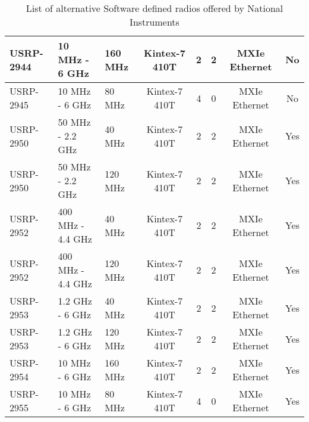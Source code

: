 \begin{landscape}
\begin{table}[htb]
\begin{center}
\begin{tabular}{|l|l|l|c|c|c|c|c|}
                USRP-2944      & 10 MHz - 6 GHz              & 160 MHz                               & Kintex-7 410T & 2               & 2                & MXIe Ethernet          & No                     \\ \hline
                USRP-2945      & 10 MHz - 6 GHz              & 80 MHz                                & Kintex-7 410T & 4               & 0                & MXIe Ethernet          & No                     \\ \hline
                USRP-2950      & 50 MHz - 2.2 GHz            & 40 MHz                                & Kintex-7 410T & 2               & 2                & MXIe Ethernet          & Yes                    \\ \hline
                USRP-2950      & 50 MHz - 2.2 GHz            & 120 MHz                               & Kintex-7 410T & 2               & 2                & MXIe Ethernet          & Yes                    \\ \hline
                USRP-2952      & 400 MHz - 4.4 GHz           & 40 MHz                                & Kintex-7 410T & 2               & 2                & MXIe Ethernet          & Yes                    \\ \hline
                USRP-2952      & 400 MHz - 4.4 GHz           & 120 MHz                               & Kintex-7 410T & 2               & 2                & MXIe Ethernet          & Yes                    \\ \hline
                USRP-2953      & 1.2 GHz - 6 GHz             & 40 MHz                                & Kintex-7 410T & 2               & 2                & MXIe Ethernet          & Yes                    \\ \hline
                USRP-2953      & 1.2 GHz - 6 GHz             & 120 MHz                               & Kintex-7 410T & 2               & 2                & MXIe Ethernet          & Yes                    \\ \hline
                USRP-2954      & 10 MHz - 6 GHz              & 160 MHz                               & Kintex-7 410T & 2               & 2                & MXIe Ethernet          & Yes                    \\ \hline
                USRP-2955      & 10 MHz - 6 GHz              & 80 MHz                                & Kintex-7 410T & 4               & 0                & MXIe Ethernet          & Yes                    \\ \hline
                \end{tabular}
            \end{center}
            \caption{List of alternative Software defined radios offered by National Instruments}
            \label{tb:USRPPartsList}
        \end{table}
\end{landscape}

